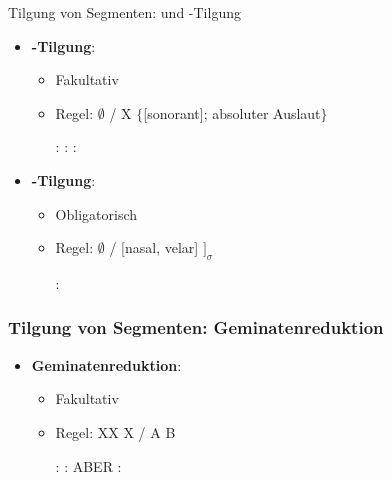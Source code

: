 \begin{frame}{Tilgung von Segmenten:  und -Tilgung}

\begin{itemize}
	\item \textbf{-Tilgung}:
	
	\begin{itemize}
		\item Fakultativ
		\item Regel:  \ras $\emptyset$ / X \underline{\quad} $\{$[sonorant]; absoluter Auslaut$\}$
	
	\eal
		\ex {}:  \ras \textipa{[ge:n]}
		\ex {}:  \ras \textipa{[k\t{aU}f]}
		\ex {}:  \ras {}
	\zl
	
	\end{itemize}

	\item \textbf{-Tilgung}:
	
	\begin{itemize}
		\item Obligatorisch
		\item Regel:  \ras $\emptyset$ / [nasal, velar] \underline{\quad} $]_\sigma$
		
		\ea {}:  \ras {}
		\z
		
	\end{itemize}
			
\end{itemize}

\end{frame}



\begin{frame}
\frametitle{Tilgung von Segmenten: Geminatenreduktion}

\begin{itemize}
	\item \textbf{Geminatenreduktion}:

	\begin{itemize}
		\item Fakultativ
		\item Regel: XX \ras X / A \underline{\quad} B

	\eal
		\ex {}:  \ras {}
		\ex {}:  \ras \textipa{[SI\.{f}a:{\textscr}t]}
		\ex ABER :  \ras \textipa{[\t{ts}o:.Po.p5]}
	\zl
	
	\end{itemize}
	
\end{itemize}

\end{frame}



